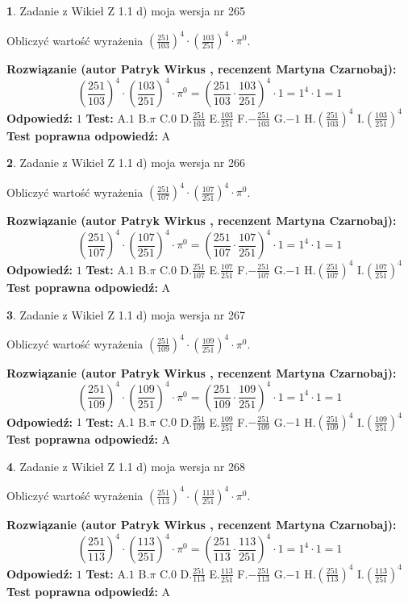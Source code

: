 \documentclass[12pt, a4paper]{article}
\theoremstyle{definition} %
\newtheorem{zad}{}
\newcommand{\zadStart}[1]{\begin{zad}#1\newline}
\newcommand{\zadStop}{\end{zad}}
\newcommand{\rozwStart}[2]{\noindent \textbf{Rozwiązanie (autor #1 , recenzent #2): }\newline}
\newcommand{\rozwStop}{\newline}
\newcommand{\odpStart}{\noindent \textbf{Odpowiedź:}\newline}
\newcommand{\odpStop}{\newline}
\newcommand{\testStart}{\noindent \textbf{Test:}\newline}
\newcommand{\testStop}{\newline}
\newcommand{\kluczStart}{\noindent \textbf{Test poprawna odpowiedź:}\newline}
\newcommand{\kluczStop}{\newline}
\begin{document}
\zadStart{Zadanie z Wikieł Z 1.1 d) moja wersja nr 265}

Obliczyć wartość wyrażenia $(\frac{251}{103})^{4} \cdot (\frac{103}{251})^{4} \cdot \pi^{0}$.
\zadStop
\rozwStart{Patryk Wirkus}{Martyna Czarnobaj}
$$(\frac{251}{103})^{4} \cdot (\frac{103}{251})^{4} \cdot \pi^{0} = (\frac{251}{103} \cdot \frac{103}{251})^{4} \cdot 1 = 1^{4} \cdot 1 = 1$$
\rozwStop
\odpStart
$1$
\odpStop
\testStart
A.$1$ B.$\pi$ C.$0$ D.$\frac{251}{103}$ E.$\frac{103}{251}$
F.$-\frac{251}{103}$ G.$-1$
H.$(\frac{251}{103})^{4}$
I.$(\frac{103}{251})^{4}$
\testStop
\kluczStart
A
\kluczStop



\zadStart{Zadanie z Wikieł Z 1.1 d) moja wersja nr 266}

Obliczyć wartość wyrażenia $(\frac{251}{107})^{4} \cdot (\frac{107}{251})^{4} \cdot \pi^{0}$.
\zadStop
\rozwStart{Patryk Wirkus}{Martyna Czarnobaj}
$$(\frac{251}{107})^{4} \cdot (\frac{107}{251})^{4} \cdot \pi^{0} = (\frac{251}{107} \cdot \frac{107}{251})^{4} \cdot 1 = 1^{4} \cdot 1 = 1$$
\rozwStop
\odpStart
$1$
\odpStop
\testStart
A.$1$ B.$\pi$ C.$0$ D.$\frac{251}{107}$ E.$\frac{107}{251}$
F.$-\frac{251}{107}$ G.$-1$
H.$(\frac{251}{107})^{4}$
I.$(\frac{107}{251})^{4}$
\testStop
\kluczStart
A
\kluczStop



\zadStart{Zadanie z Wikieł Z 1.1 d) moja wersja nr 267}

Obliczyć wartość wyrażenia $(\frac{251}{109})^{4} \cdot (\frac{109}{251})^{4} \cdot \pi^{0}$.
\zadStop
\rozwStart{Patryk Wirkus}{Martyna Czarnobaj}
$$(\frac{251}{109})^{4} \cdot (\frac{109}{251})^{4} \cdot \pi^{0} = (\frac{251}{109} \cdot \frac{109}{251})^{4} \cdot 1 = 1^{4} \cdot 1 = 1$$
\rozwStop
\odpStart
$1$
\odpStop
\testStart
A.$1$ B.$\pi$ C.$0$ D.$\frac{251}{109}$ E.$\frac{109}{251}$
F.$-\frac{251}{109}$ G.$-1$
H.$(\frac{251}{109})^{4}$
I.$(\frac{109}{251})^{4}$
\testStop
\kluczStart
A
\kluczStop



\zadStart{Zadanie z Wikieł Z 1.1 d) moja wersja nr 268}

Obliczyć wartość wyrażenia $(\frac{251}{113})^{4} \cdot (\frac{113}{251})^{4} \cdot \pi^{0}$.
\zadStop
\rozwStart{Patryk Wirkus}{Martyna Czarnobaj}
$$(\frac{251}{113})^{4} \cdot (\frac{113}{251})^{4} \cdot \pi^{0} = (\frac{251}{113} \cdot \frac{113}{251})^{4} \cdot 1 = 1^{4} \cdot 1 = 1$$
\rozwStop
\odpStart
$1$
\odpStop
\testStart
A.$1$ B.$\pi$ C.$0$ D.$\frac{251}{113}$ E.$\frac{113}{251}$
F.$-\frac{251}{113}$ G.$-1$
H.$(\frac{251}{113})^{4}$
I.$(\frac{113}{251})^{4}$
\testStop
\kluczStart
A
\kluczStop
\end{document}
